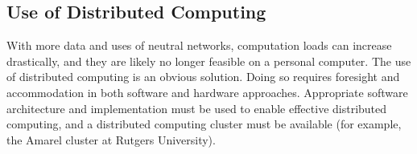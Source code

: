 \subsection{Use of Distributed Computing}

With more data and uses of neutral networks, computation loads can increase drastically, and they are likely no longer feasible on a personal computer. The use of distributed computing is an obvious solution. Doing so requires foresight and accommodation in both software and hardware approaches. Appropriate software architecture and implementation must be used to enable effective distributed computing, and a distributed computing cluster must be available (for example, the Amarel cluster at Rutgers University).
